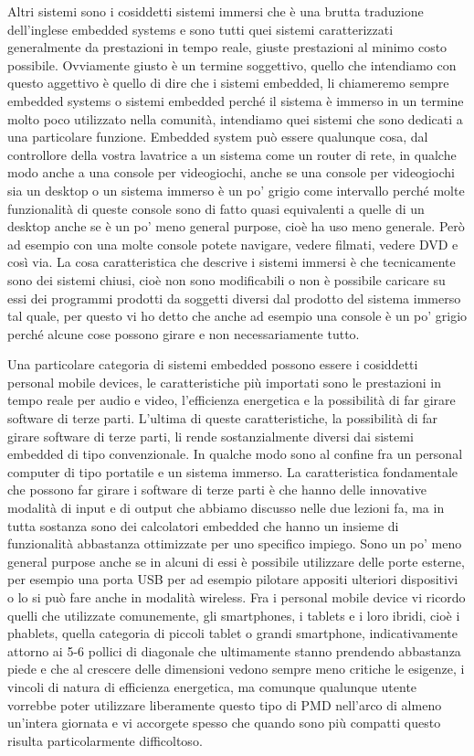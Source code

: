 Altri sistemi sono i cosiddetti sistemi immersi che è una brutta traduzione dell'inglese embedded systems e sono tutti quei sistemi caratterizzati generalmente da prestazioni in tempo reale, giuste prestazioni al minimo costo possibile.
Ovviamente giusto è un termine soggettivo, quello che intendiamo con questo aggettivo è quello di dire che i sistemi embedded, li chiameremo sempre embedded systems o sistemi embedded perché il sistema è immerso in un termine molto poco utilizzato nella comunità, intendiamo quei sistemi che sono dedicati a una particolare funzione.
Embedded system può essere qualunque cosa, dal controllore della vostra lavatrice a un sistema come un router di rete, in qualche modo anche a una console per videogiochi, anche se una console per videogiochi sia un desktop o un sistema immerso è un po' grigio come intervallo perché molte funzionalità di queste console sono di fatto quasi equivalenti a quelle di un desktop anche se è un po' meno general purpose, cioè ha uso meno generale. Però ad esempio con una molte console potete navigare, vedere filmati, vedere DVD e così via.
La cosa caratteristica che descrive i sistemi immersi è che tecnicamente sono dei sistemi chiusi, cioè non sono modificabili o non è possibile caricare su essi dei programmi prodotti da soggetti diversi dal prodotto del sistema immerso tal quale, per questo vi ho detto che anche ad esempio una console è un po' grigio perché alcune cose possono girare e non necessariamente tutto.

Una particolare categoria di sistemi embedded possono essere i cosiddetti personal mobile devices, le caratteristiche più importati sono le prestazioni in tempo reale per audio e video, l'efficienza energetica e la possibilità di far girare software di terze parti.
L'ultima di queste caratteristiche, la possibilità di far girare software di terze parti, li rende sostanzialmente diversi dai sistemi embedded di tipo convenzionale.
In qualche modo sono al confine fra un personal computer di tipo portatile e un sistema immerso. La caratteristica fondamentale che possono far girare i software di terze parti è che hanno delle innovative modalità di input e di output che abbiamo discusso nelle due lezioni fa, ma in tutta sostanza sono dei calcolatori embedded che hanno un insieme di funzionalità abbastanza ottimizzate per uno specifico impiego.
Sono un po' meno general purpose anche se in alcuni di essi è possibile utilizzare delle porte esterne, per esempio una porta USB per ad esempio pilotare appositi ulteriori dispositivi o lo si può fare anche in modalità wireless.
Fra i personal mobile device vi ricordo quelli che utilizzate comunemente, gli smartphones, i tablets e i loro ibridi, cioè i phablets, quella categoria di piccoli tablet o grandi smartphone, indicativamente attorno ai 5-6 pollici di diagonale che ultimamente stanno prendendo abbastanza piede e che al crescere delle dimensioni vedono sempre meno critiche le esigenze, i vincoli di natura di efficienza energetica, ma comunque qualunque utente vorrebbe poter utilizzare liberamente questo tipo di PMD nell'arco di almeno un'intera giornata e vi accorgete spesso che quando sono più compatti questo risulta particolarmente difficoltoso.

